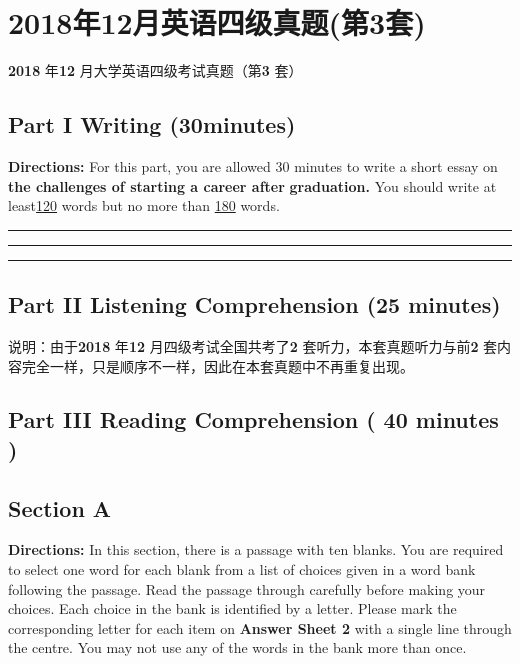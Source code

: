 \documentclass[UTF8,11pt]{ctexart}
\begin{document}
\section*{2018年12月英语四级真题(第3套)}
\textbf{2018} 年\textbf{12} 月大学英语四级考试真题（第\textbf{3} 套）


\subsection*{\textbf{Part I} \textbf{Writing} \textbf{(30minutes)}}


\textbf{Directions:} For this part, you are allowed 30 minutes to write a short essay on\textbf{ the challenges of starting a career after} \textbf{graduation.} You should write at least\uline{120} words but no more than \uline{180} words. \par\noindent\rule{.95\linewidth}{.4pt}\par  \par\noindent\rule{.95\linewidth}{.4pt}\par  \par\noindent\rule{.95\linewidth}{.4pt}\par


\subsection*{\textbf{Part II} \textbf{Listening Comprehension} \textbf{(25 minutes)}}


说明：由于\textbf{2018} 年\textbf{12} 月四级考试全国共考了\textbf{2} 套听力，本套真题听力与前\textbf{2} 套内容完全一样，只是顺序不一样，因此在本套真题中不再重复出现。


\subsection*{\textbf{Part} III \textbf{Reading Comprehension} \textbf{( 40 minutes )}}


\subsection*{\textbf{Section A}}


\textbf{Directions:} In this section, there is a passage with ten blanks. You are required to select one word for each blank from a list of choices given in a word bank following the passage. Read the passage through carefully before making your choices. Each choice in the bank is identified by a letter. Please mark the corresponding letter for each item on\textbf{ Answer Sheet 2} with a single line through the centre. You may not use any of the words in the bank more than once.
\end{document}
